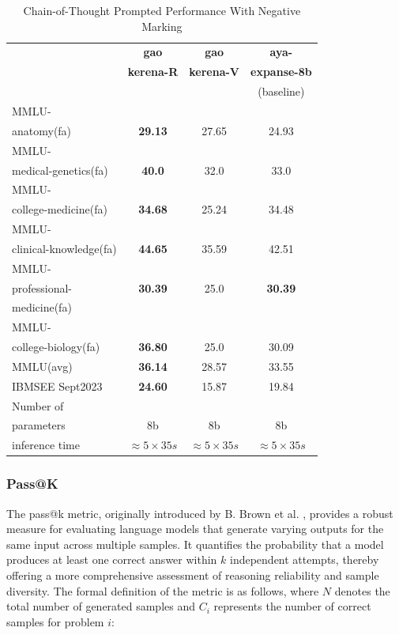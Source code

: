 \documentclass[conference]{IEEEtran}
\begin{document}
	\begin{table}[ht]
		\centering
		\caption{Chain-of-Thought Prompted Performance With Negative Marking}
		\begin{tabular}{|l|c|c|c|}  
			\hline
			\textbf{} & \textbf{gao} & \textbf{gao} & \textbf{aya-} \\ 
			& \textbf{kerena-R} &  \textbf{kerena-V} & \textbf{expanse-8b} \\
			&   & &(baseline)  \\ \hline
			MMLU- &  &  &  \\ 
			anatomy(fa)  & \textbf{29.13} & 27.65  & 24.93  \\ \hline
			MMLU- &    &  &  \\
			medical-genetics(fa) & \textbf{40.0}  & 32.0  & 33.0  \\ \hline
			MMLU- &  &    &  \\
			college-medicine(fa) & \textbf{34.68}  & 25.24  & 34.48  \\ \hline
			MMLU- &    &  &  \\
			clinical-knowledge(fa)& \textbf{44.65} & 35.59  & 42.51  \\ \hline
			MMLU- &  &  &  \\
			professional-& \textbf{30.39} & 25.0 & \textbf{30.39}   \\
                        medicine(fa)& &  &  \\ \hline
			MMLU- &  &  &  \\
			college-biology(fa)& \textbf{36.80} & 25.0  & 30.09  \\ \hline
			MMLU(avg) & \textbf{36.14} & 28.57  & 33.55  \\ \hline
			IBMSEE Sept2023 & \textbf{24.60}  & 15.87 & 19.84   \\ \hline
			Number of&  &  &  \\
			parameters & 8b & 8b & 8b \\ \hline
			inference time & $\approx 5 \times 35s$ & $\approx 5 \times 35s$ & $\approx 5 \times 35s$ \\  \hline
		\end{tabular}
		\label{tab:med_reasoning_capabillities_NM_comparison}
	\end{table}
           
           \subsubsection{Pass@K}
The pass@k metric, originally introduced by B. Brown et al.
\cite{b20}, 
provides a robust measure for evaluating language models that generate varying outputs for the same input across multiple samples. It quantifies the probability that a model produces at least one correct answer within \(k\) independent attempts, thereby offering a more comprehensive assessment of reasoning reliability and sample diversity. The formal definition of the metric is as follows, where \(N\) denotes the total number of generated samples and \(C_i\) represents the number of correct samples for problem \(i\):
\end{document}
